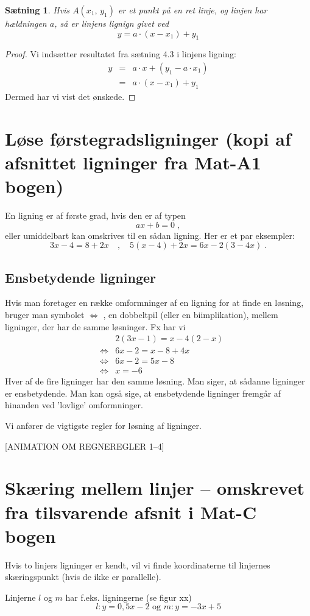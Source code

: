 \documentclass[12pt,oneside,a4paper]{article}
\newcommand{\bas}{\begin{eqnarray*}}
\newcommand{\eas}{\end{eqnarray*}}
\newtheorem{thm}{Sætning}[section]
\begin{document}
\begin{thm}
    Hvis $A(x_1,\,y_1)$ er et punkt på en ret linje, og linjen har hældningen
    $a$, så er linjens lignign givet ved
    $$
    y = a\cdot (x-x_1) + y_1 
    $$
\end{thm}
\begin{proof}
    Vi indsætter resultatet fra sætning 4.3 i linjens ligning:
\bas
y &=& a\cdot x + (y_1 - a\cdot x_1) \\
  &=& a\cdot (x-x_1) + y_1 
\eas
Dermed har vi vist det ønskede.
\end{proof}


\section{Løse førstegradsligninger (kopi af afsnittet ligninger fra Mat-A1 bogen)}
En ligning er af første grad, hvis den er af typen
$$
ax + b = 0\; ,
$$
eller umiddelbart kan omskrives til en sådan ligning. Her er et par eksempler:
$$
3x - 4 = 8 + 2x \quad , \quad 5(x - 4) + 2x = 6x - 2(3 - 4x)\; .
$$

\subsection{Ensbetydende ligninger}
Hvis man foretager en række omformninger af en ligning for at finde en løsning,
bruger man symbolet $\iff$ , en dobbeltpil (eller en biimplikation), mellem
ligninger, der har de samme løsninger. Fx har vi
\bas
&& 2(3x - 1) = x - 4(2 - x)\\
&\iff& 6x - 2 = x - 8 + 4x\\
&\iff& 6x - 2 = 5x - 8 \\
&\iff& x = -6 
\eas
Hver af de fire ligninger har den samme løsning. Man siger, at sådanne
ligninger er ensbetydende. Man kan også sige, at ensbetydende ligninger fremgår
af hinanden ved ’lovlige’ omformninger.

Vi anfører de vigtigste regler for løsning af ligninger.

[ANIMATION OM REGNEREGLER 1--4]


\section{Skæring mellem linjer -- omskrevet fra tilsvarende afsnit i Mat-C bogen}
Hvis to linjers ligninger er kendt, vil vi finde koordinaterne til linjernes
skæringspunkt (hvis de ikke er parallelle).

Linjerne $l$ og $m$ har f.eks. ligningerne (se figur xx)
$$
l: y=0,5x-2\,\,{\mbox{og}}\,\,m: y=-3x+5
$$
\end{document}
